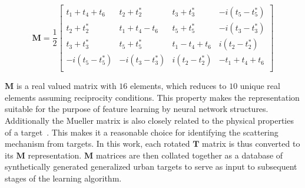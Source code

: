 \begin{equation}
\mathbf{M} = 
\frac{1}{2} 
\begin{bmatrix}
t_1+t_4+t_6 & t_2+t_2^* & t_3+t_3^* & -i(t_5-t_5^*) \\
t_2 + t_2^* & t_1+t_4-t_6 & t_5+t_5^* & -i(t_3-t_3^*) \\
t_3 + t_3^* & t_5+t_5^* & t_1 - t_4 + t_6 & i(t_2 - t_2^*) \\
-i(t_5-t_5^*) & -i(t_3-t_3^*) & i(t_2 - t_2^*) & -t_1 + t_4 + t_6 \\
\end{bmatrix}
\end{equation}

$\mathbf{M}$ is a real valued matrix with $16$ elements, which reduces to $10$ unique real elements assuming reciprocity conditions.  
This property makes the representation suitable for the purpose of feature learning by neural network structures. Additionally the Mueller matrix is also closely related to the physical properties of a target~\cite{barakat1981bilinear}. This makes it a reasonable choice for identifying the scattering mechanism from targets. In this work, each rotated $\mathbf{T}$ matrix is thus converted to its $\mathbf{M}$ representation.  $\mathbf{M}$ matrices are then collated together as a database of synthetically generated generalized urban targets to serve as input to subsequent stages of the learning algorithm.














